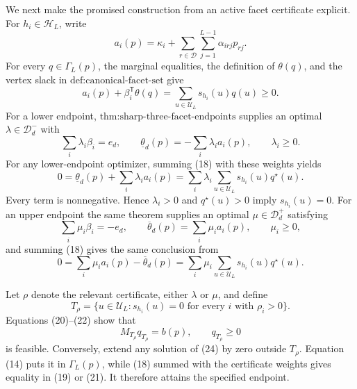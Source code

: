 We next make the promised construction from an active facet certificate explicit.  For \(h_i\in\mathcal H_L\), write
\[
 a_i(p)=\kappa_i+\sum_{r\in\mathcal D}\sum_{j=1}^{L-1}\alpha_{irj}p_{rj}.
\]
For every \(q\in\Gamma_L(p)\), the marginal equalities, the definition of \(\theta(q)\), and the vertex slack in \(\text{def:canonical-facet-set}\) give
\[
 a_i(p)+\beta_i^{\mathsf T}\theta(q)
 =\sum_{u\in\mathcal U_L}s_{h_i}(u)q(u)\geq0.                              \tag{18}
\]
For a lower endpoint, \(\text{thm:sharp-three-facet-endpoints}\) supplies an optimal \(\lambda\in\mathcal D_d^-\) with
\[
 \sum_i\lambda_i\beta_i=e_d,
 \qquad
 \underline\theta_d(p)=-\sum_i\lambda_i a_i(p),
 \qquad \lambda_i\geq0.                                                     \tag{19}
\]
For any lower-endpoint optimizer, summing (18) with these weights yields
\[
 0=\underline\theta_d(p)+\sum_i\lambda_i a_i(p)
 =\sum_i\lambda_i\sum_{u\in\mathcal U_L}s_{h_i}(u)q^\star(u).             \tag{20}
\]
Every term is nonnegative.  Hence \(\lambda_i>0\) and \(q^\star(u)>0\) imply \(s_{h_i}(u)=0\).  For an upper endpoint the same theorem supplies an optimal \(\mu\in\mathcal D_d^+\) satisfying
\[
 \sum_i\mu_i\beta_i=-e_d,
 \qquad
 \overline\theta_d(p)=\sum_i\mu_i a_i(p),
 \qquad \mu_i\geq0,                                                        \tag{21}
\]
and summing (18) gives the same conclusion from
\[
 0=\sum_i\mu_i a_i(p)-\overline\theta_d(p)
 =\sum_i\mu_i\sum_{u\in\mathcal U_L}s_{h_i}(u)q^\star(u).                \tag{22}
\]

Let \(\rho\) denote the relevant certificate, either \(\lambda\) or \(\mu\), and define
\[
 T_\rho=\{u\in\mathcal U_L:s_{h_i}(u)=0
             \text{ for every }i\text{ with }\rho_i>0\}.                  \tag{23}
\]
Equations (20)--(22) show that
\[
 M_{T_\rho}q_{T_\rho}=b(p),\qquad q_{T_\rho}\geq0                         \tag{24}
\]
is feasible.  Conversely, extend any solution of (24) by zero outside \(T_\rho\).  Equation (14) puts it in \(\Gamma_L(p)\), while (18) summed with the certificate weights gives equality in (19) or (21).  It therefore attains the specified endpoint.

